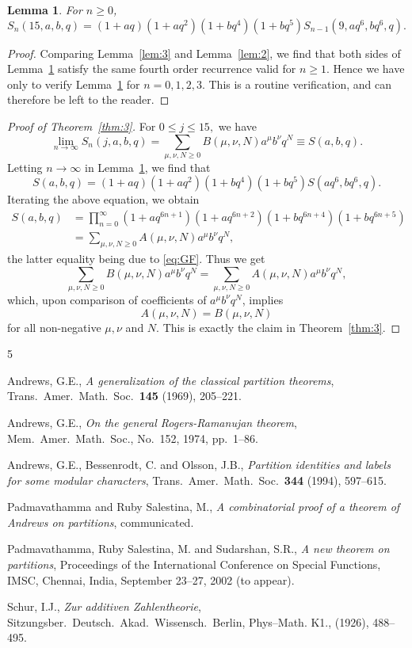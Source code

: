 \documentclass[12pt,twoside]{amsart}
\newtheorem{Lemma}[Theorem]{Lemma}
\theoremstyle{remark}
\numberwithin{equation}{section}
\begin{document}
\begin{Lemma}\label{lem:4}
For $n\geq0$,
$$ S_n(15,a,b,q) =
(1+aq)(1+aq^2)(1+bq^4)(1+bq^5)S_{n-1}(9,aq^6,bq^6,q). $$
\end{Lemma}

\begin{proof}
Comparing Lemma~\ref{lem:3} and Lemma~\ref{lem:2}, we find that
both sides of Lemma~\ref{lem:4} satisfy the same fourth order
recurrence valid for $ n \geq 1. $ Hence we have only to verify
Lemma~\ref{lem:4} for $n = 0,1,2,3$. This is a routine
verification, and can therefore be left to the reader.
\end{proof}

\begin{proof}[Proof of Theorem~\ref{thm:3}]
For $  0 \leq j \leq 15, $ we have
$$ \lim_{n\to\infty}S_{n}(j,a,b,q)
 = \sum_{\mu,\nu,N \geq 0} B(\mu,\nu,N)a^{\mu}b^{\nu}q^N \equiv S(a,b,q).$$
 Letting $ n\rightarrow \infty $ in Lemma~\ref{lem:4}, we find that
 $$ S(a,b,q) =(1+aq)(1+aq^2)(1+bq^4)(1+bq^5)S(aq^6,bq^6,q) .$$
 Iterating the above equation, we obtain
\begin{align*}
 S(a,b,q) &= \prod_{n=0} ^\infty
(1+aq^{6n+1})(1+aq^{6n+2})(1+bq^{6n+4})(1+bq^{6n+5}) \\
& = \sum_{\mu,\nu,N \geq 0} A(\mu,\nu,N)a^{\mu}b^{\nu}q^N ,
\end{align*}
the latter equality being due to \eqref{eq:GF}.
 Thus we get
 $$  \sum_{\mu,\nu,N \geq 0} B(\mu,\nu,N)a^{\mu}b^{\nu}q^N
=  \sum_{\mu,\nu,N \geq 0} A(\mu,\nu,N)a^{\mu}b^{\nu}q^N ,$$
 which, upon comparison of coefficients of $a^{\mu}b^{\nu}q^N $, implies
  $$ A(\mu,\nu,N) = B(\mu,\nu,N) $$
  for all non-negative $\mu,\nu$ and $N$. This is exactly the claim in
Theorem~\ref{thm:3}.
\end{proof}


\begin{thebibliography}{5}


 Andrews, G.E., {\em A generalization of the classical partition
theorems}, Trans.\ Amer.\ Math.\ Soc.\ {\bf 145} (1969), 205--221.


 Andrews, G.E., {\em On the general Rogers-Ramanujan theorem},
Mem.\ Amer.\ Math.\ Soc., No.~152, 1974, pp.~1--86.

 Andrews, G.E., Bessenrodt, C. and Olsson, J.B., {\em Partition
identities and labels for some modular characters},
Trans.\ Amer.\ Math.\ Soc.\ {\bf 344}
(1994), 597--615.

 Padmavathamma and Ruby Salestina, M., {\em A combinatorial proof
of a theorem of Andrews on partitions}, communicated.

 Padmavathamma, Ruby Salestina, M. and Sudarshan, S.R., {\em A new
theorem on partitions}, Proceedings of the International Conference
on Special Functions, IMSC, Chennai, India, September 23--27, 2002
(to appear).

 Schur, I.J., {\em Zur additiven Zahlentheorie},
Sitzungsber.\ Deutsch.\ Akad.\
Wissensch.\ Berlin, Phys--Math. K1., (1926), 488--495.



\end{thebibliography}
\end{document}
